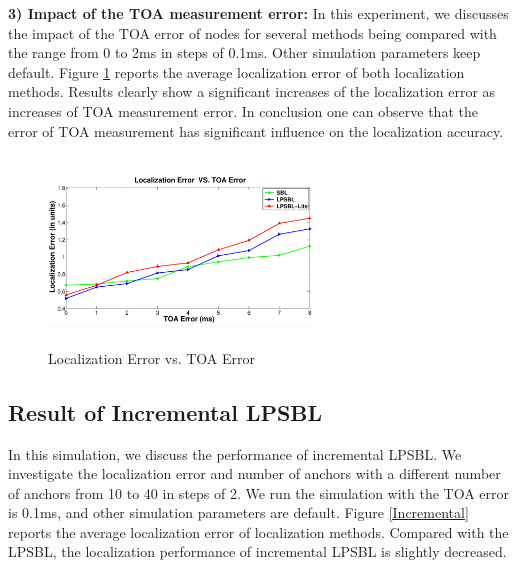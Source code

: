 \textbf{3) Impact of the TOA measurement error:}
In this experiment, we discusses the impact of the TOA error of nodes for several methods being compared with the range from 0 to 2ms in steps of 0.1ms. 
Other simulation parameters keep default. 
Figure \ref{fig6} reports the average localization error of both localization methods. 
Results clearly show a significant increases of the localization error as increases of TOA measurement error.
In conclusion one can observe that the error of TOA measurement has significant influence on the localization accuracy. 
  \begin{figure}[htb]       
            \centering
			\vspace{-3mm}
            \includegraphics[height=5.0cm,width=7.0cm]{image/TOA.eps}
                \caption{Localization Error vs. TOA Error}
             \vspace{-8mm}
             \label{fig6}
        \end{figure}

  
 \subsection{Result of Incremental LPSBL}
 In this simulation, we discuss the performance of incremental LPSBL.
We investigate the localization error and number of anchors with a different number of anchors from 10 to 40 in steps of 2. 
 We run the simulation with the TOA error is 0.1ms, and other simulation parameters are default. 
 Figure \ref{Incremental} reports the average localization error of localization methods. 
 Compared with the LPSBL, the localization performance of incremental LPSBL is slightly decreased.
 
